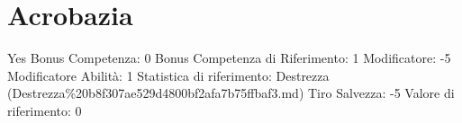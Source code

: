 \section{Acrobazia}\label{acrobazia}

\begin{description}
\tightlist
\item[Tags: ABI]
Yes Bonus Competenza: 0 Bonus Competenza di Riferimento: 1 Modificatore:
-5 Modificatore Abilità: 1 Statistica di riferimento: Destrezza
(Destrezza\%20b8f307ae529d4800bf2afa7b75ffbaf3.md) Tiro Salvezza: -5
Valore di riferimento: 0
\end{description}
